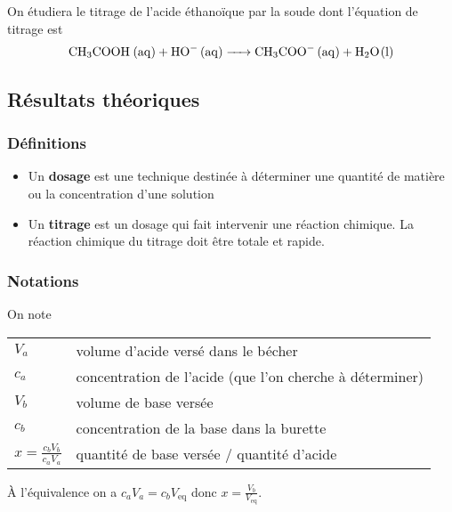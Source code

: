 \documentclass{tp}
\begin{document}
On étudiera le titrage de l'acide éthanoïque par la soude dont l'équation de titrage est 
\begin{equation}
  \ce{CH3COOH (aq) + HO- (aq) -> CH3COO- (aq) + H2O(l)}
\end{equation}

\subsection{Résultats théoriques}%
\label{sub:partie_theorique}

\subsubsection{Définitions}%
\label{ssub:definitions}
\begin{itemize}
\item Un \textbf{dosage} est une technique destinée à déterminer une quantité de matière ou la concentration d'une solution

\item Un \textbf{titrage} est un dosage qui fait intervenir une réaction chimique.  La réaction chimique du titrage doit être totale et rapide.
\end{itemize}

\subsubsection{Notations}%
\label{ssub:notations}

On note 
\begin{center}
  \begin{tabular}{ll}
    \toprule
  $V_a$ & volume d'acide versé dans le bécher \\
  $c_a$ & concentration de l'acide (que l'on cherche à déterminer)\\
  $V_b$ & volume de base versée \\
  $c_b$ & concentration de la base dans la burette \\
  $x = \frac{c_bV_b}{c_aV_a}$ & quantité de base versée / quantité d'acide\\
  \bottomrule
  \end{tabular}
\end{center}
À l'équivalence on a $c_aV_a = c_bV_\text{eq}$ donc $x=\frac{V_b}{V_\text{eq}}$.  
\end{document}
